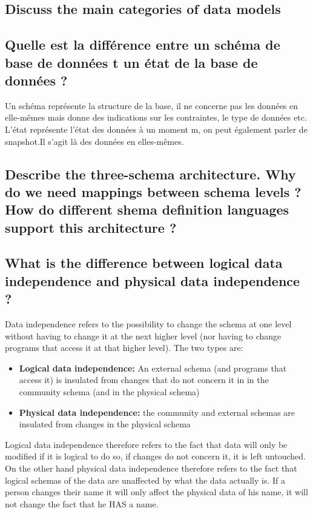 \subsection{Discuss the main categories of data models}


\subsection{Quelle est la différence entre un schéma de base de données t  un état de la base de données ?}
Un schéma représente la structure de la base, il ne concerne pas les données 
en elle-mêmes mais donne des indications sur les contraintes, le type de données etc.
L'état représente l'état des données à un moment m, on 
peut également parler de snapshot.Il s'agit là des données en elles-mêmes.


\subsection{Describe the three-schema architecture. Why do we need mappings between schema levels ? How do different shema definition languages support this architecture ?}


\subsection{What is the difference between logical data independence and physical data independence ?}
Data independence refers to the possibility to change the schema at one level without having to change it at the next higher level (nor having to change programs that access it at that higher level). The two types are:
\begin{itemize}
	\item \textbf{Logical data independence:} An external schema (and programs that access it) is insulated from changes that do not concern it in in the community schema (and in the physical schema)
	\item \textbf{Physical data independence:} the community and external schemas are insulated from changes in the physical schema
\end{itemize}
Logical data independence therefore refers to the fact that data will only be modified if it is logical to do so, if changes do not concern it, it is left untouched.
On the other hand physical data independence therefore refers to the fact that logical schemas of the data are unaffected by what the data actually is. If a person changes their name it will only affect the physical data of his name, it will not change the fact that he HAS a name.

